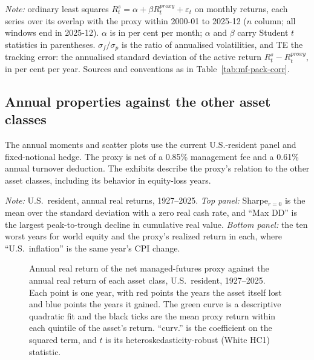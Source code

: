 \begin{table}[H]
\centering
\caption{Regressions of managed-futures benchmarks and investable funds on
the net proxy}
\label{tab:mf-pack-reg}
\footnotesize

\begin{minipage}{0.86\textwidth}\footnotesize
\textit{Note:} ordinary least squares $R^{s}_t = \alpha + \beta
R^{proxy}_t + \varepsilon_t$ on monthly returns, each series over its
overlap with the proxy within 2000-01 to 2025-12 ($n$ column; all windows end
in 2025-12). $\alpha$ is
in per cent per month; $\alpha$ and $\beta$ carry Student $t$ statistics in
parentheses. $\sigma_f/\sigma_p$ is the ratio of annualised volatilities, and
TE the tracking error: the annualised standard deviation of the active return
$R^{s}_t - R^{proxy}_t$, in per cent per year. Sources and conventions as
in Table~\ref{tab:mf-pack-corr}.
\end{minipage}
\end{table}

\subsection{Annual properties against the other asset classes}
\label{app:mf-annual}
The annual moments and scatter plots use the current U.S.-resident panel
and fixed-notional hedge. The proxy is net of a 0.85\% management fee and a
0.61\% annual turnover deduction. The exhibits describe the proxy's relation to the other asset classes,
including its behavior in equity-loss years.
\begin{table}[H]
\centering
\caption{The managed-futures proxy against the other asset classes}
\label{tab:mf-diagnostics}
\small

\begin{minipage}{0.94\textwidth}\footnotesize
\textit{Note:} U.S.\ resident, annual real returns, 1927--2025. \emph{Top
panel:} Sharpe$_{r=0}$ is the mean over the standard deviation with a zero real
cash rate, and ``Max DD'' is the largest peak-to-trough decline in cumulative
real value. \emph{Bottom panel:} the ten worst years for world equity and the
proxy's realized return in each, where ``U.S.\ inflation'' is the same year's
CPI change.
\end{minipage}
\end{table}

\begin{figure}[H]
\centering

\caption{Annual real return of the net managed-futures proxy against the annual
real return of each asset class, U.S.\ resident, 1927--2025. Each point is one
year, with red points the years the asset itself lost and blue points the years
it gained. The green curve is a descriptive quadratic fit and the black ticks
are the mean proxy return within each quintile of the asset's return. ``curv.''
is the coefficient on the squared term, and $t$ is its
heteroskedasticity-robust (White HC1) statistic.}
\label{fig:mf-convexity}
\end{figure}

